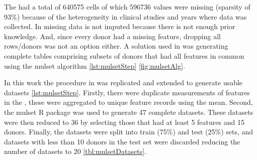 The \firstvis had a total of 640575 cells of which 596736 values were
missing (sparsity of 93\%) because of the heterogeneity in clinical studies and
years where data was collected. In \spaper missing data is not imputed because
there is not enough prior knowledge. And, since every donor had a missing
feature, dropping all rows/donors was not an option either. A solution used in
\spaper was generating complete tables comprising subsets of donors that had
all features in common using the mulset algorithm \autoref{lst:mulsetStep}
\autoref{fig:mulsetAlg}.

In this work the procedure in \spaper was replicated and extended to generate
usable datasets \autoref{lst:mulsetStep}. Firstly, there were duplicate
measurements of features in the \firstvis, these were aggregated to unique
feature records using the mean.  Second, the mulset R package was used to
generate 47 complete datasets. These datasets were then reduced to 36 by
selecting those that had at least 5 features and 15 donors. Finally, the
datasets were split into train (75\%) and test (25\%) sets, and datasets with
less than 10 donors in the test set were discarded reducing the number of
datasets to 20 \autoref{tbl:mulsetDatasets}.


